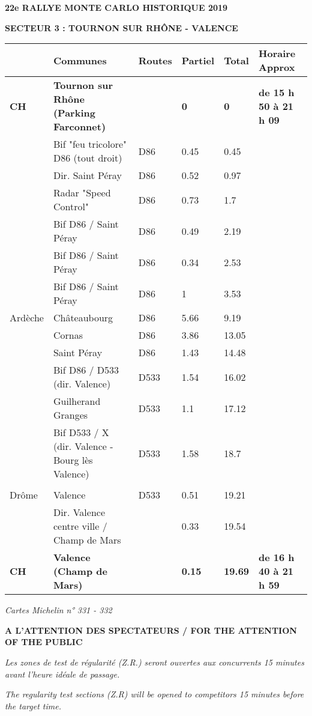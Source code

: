 \documentclass{article}%
\begin{document}
%
\normalsize%
\begin{center} \textbf{\LARGE{22e RALLYE MONTE CARLO HISTORIQUE 2019}} \end{center}%
\begin{flushleft} \textbf{SECTEUR 3 : TOURNON SUR RHÔNE - VALENCE
} \end{flushleft}%
\begin{flushright}           \end{flushright}%
%
\begin{longtable}{p{2.25cm}|p{7.0cm}|p{1.5cm}|p{1.5cm}|p{1.5cm}|p{3.5cm}}%
\hline%
&Communes&Routes&Partiel&Total&Horaire Approx\\%
\hline%
\endhead%
\endfoot%
\endlastfoot%
\textbf{﻿CH}&\textbf{Tournon sur Rhône (Parking Farconnet)}& &\textbf{0}&\textbf{0}&\textbf{de 15 h 50 à 21 h 09}\\%
 &Bif "feu tricolore"  D86 (tout droit)&D86&0.45&0.45& \\%
 &Dir. Saint Péray&D86&0.52&0.97& \\%
 &Radar "Speed Control"&D86&0.73&1.7& \\%
 &Bif D86 / Saint Péray&D86&0.49&2.19& \\%
 &Bif D86 / Saint Péray&D86&0.34&2.53& \\%
 &Bif D86 / Saint Péray&D86&1&3.53& \\%
Ardèche &Châteaubourg&D86&5.66&9.19& \\%
 &Cornas&D86&3.86&13.05& \\%
 &Saint Péray&D86&1.43&14.48& \\%
 &Bif D86 / D533 (dir. Valence)&D533&1.54&16.02& \\%
 &Guilherand  Granges&D533&1.1&17.12& \\%
 &Bif D533 / X (dir. Valence - Bourg lès Valence)&D533&1.58&18.7& \\%
\hline& & & & & \\%
Drôme&Valence&D533&0.51&19.21& \\%
 &Dir. Valence centre ville / Champ de Mars& &0.33&19.54& \\%
\textbf{CH}&\textbf{Valence (Champ de Mars)}& &\textbf{0.15}&\textbf{19.69}&\textbf{de 16 h 40 à 21 h 59}\\%
\hline%
\end{longtable}%
\begin{flushleft} \textit{Cartes Michelin n° 331 - 332
} \end{flushleft}%
\begin{center} \textbf{A L’ATTENTION DES SPECTATEURS / FOR THE ATTENTION OF THE PUBLIC 							
} \end{center}%
\begin{center} \textit{Les zones de test de régularité (Z.R.) seront ouvertes aux concurrents 15 minutes avant l’heure idéale de passage.							
} \end{center}%
\begin{center} \textit{The regularity test sections (Z.R) will be opened to competitors 15 minutes before the target time.							
} \end{center}%
\end{document}
